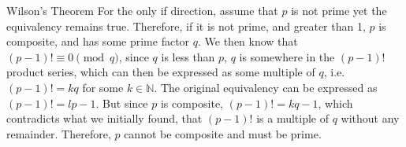 \begin{homeworkProblem}{Wilson's Theorem}
    For the only if direction, assume that $p$ is not prime yet the equivalency 
    remains true. Therefore, if it is not prime, and greater than 1, $p$ is composite,
    and has some prime factor $q$. We then know that $(p-1)! \equiv 0 \pmod{q}$,
    since $q$ is less than $p$, $q$ is somewhere in the $(p-1)!$ product series,
    which can then be expressed as some multiple of $q$, i.e. $(p-1)! = kq$ for 
    some $k \in \mathbb{N}$. The original equivalency can be expressed as $(p-1)!
    = lp -1$. But since $p$ is composite, $(p-1)! = kq - 1$, which contradicts
    what we initially found, that $(p-1)!$ is a multiple of $q$ without any remainder.
    Therefore, $p$ cannot be composite and must be prime. 

    
\end{homeworkProblem}